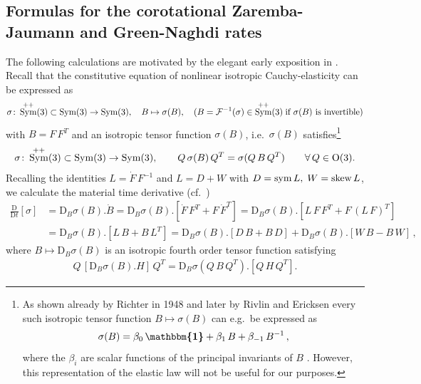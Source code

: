 \documentclass[10pt]{article}
\numberwithin{theoremCounter}{section}
\theoremstyle{plain}
\theoremstyle{definition}
\newcommand{\id}{{\boldsymbol{\mathbbm{1}}}}
\newcommand{\OO}{{\rm O}}
\newcommand{\DD}{\mathrm{D}}
\DeclareMathOperator{\Sym}{Sym}
\DeclareMathOperator{\sym}{sym}
\def\sk{\textnormal{skew}}
\numberwithin{equation}{section}
\begin{document}
\subsection{Formulas for the corotational Zaremba-Jaumann and Green-Naghdi rates} \label{sechypoelastic}
%
The following calculations are motivated by the elegant early exposition in \cite{fei1994}. Recall that the constitutive equation of nonlinear isotropic Cauchy-elasticity can be expressed as
	\begin{align}
	\label{eqratetype1}
	\sigma\colon \Sym^{++}(3) \subset \Sym(3) \to \Sym(3), \quad B \mapsto \sigma(B), \quad (B = \mathcal{F}^{-1}(\sigma) \in \Sym^{++}(3) \; \textnormal{if $\sigma(B)$ is invertible})
	\end{align}
with $B = F\, F^T$ and an isotropic tensor function $\sigma(B)$, i.e.~$\sigma(B)$ satisfies\footnote
{
As shown already by Richter in 1948 \cite{richter1948isotrope, richter1949hauptaufsatze, Richter50, Richter52} and later by Rivlin and Ericksen \cite{rivlin1955} every such isotropic tensor function $B \mapsto \sigma(B)$ can e.g.~be expressed as
	\begin{align}
	\sigma(B) = \beta_0 \, \id + \beta_1 \, B + \beta_{-1} \, B^{-1}\,,
	\end{align}
where the $\beta_i$ are scalar functions of the principal invariants of $B$ \cite{mihai2017}. However, this representation of the elastic law will not be useful for our purposes.
}
	\begin{align}
	\label{eqratetype02}
	\sigma\colon \Sym^{++}(3) \subset \Sym(3) \to \Sym(3), \qquad Q \, \sigma(B) \, Q^T = \sigma(Q \, B \, Q^T) \qquad \forall \, Q \in \OO(3).
	\end{align}
Recalling the identities $L = \dot{F} \, F^{-1}$ and $L = D + W$ with $D = \sym L, \; W = \sk \, L$, we calculate the material time derivative (cf.~\cite[p.37]{Noll55}) 
	\begin{equation}
	\label{eqratetype2}
	\begin{alignedat}{2}
	\frac{\DD}{\DD t}[\sigma] &= \DD_B\sigma(B).\dot{B} = \DD_B\sigma(B).[\dot{F} \, F^T + F \, \dot{F}^T] = \DD_B\sigma(B).[L \, F \, F^T + F \, (L \, F)^T] \\
	&= \DD_B\sigma(B).[L \, B + B \, L^T] =\DD_B\sigma(B).[D \, B + B \, D] + \DD_B\sigma(B).[W \, B - B \, W] \, ,
	\end{alignedat}
	\end{equation}
where $B \mapsto \DD_B\sigma(B)$ is an isotropic fourth order tensor function satisfying
	\begin{align}
	\label{eqratetype01}
	Q \, [\DD_B\sigma(B).H] \, Q^T = \DD_B\sigma(Q \, B \, Q^T).[Q \, H \, Q^T].
	\end{align}
\end{document}
